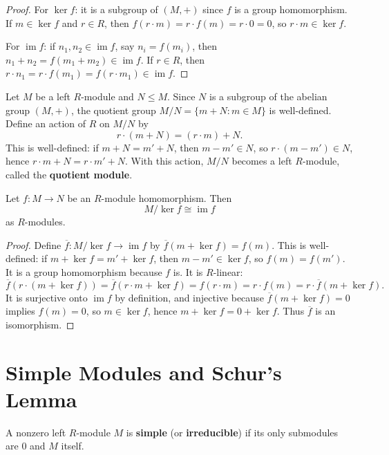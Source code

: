 \begin{proof}
For $\ker f$: it is a subgroup of $(M, +)$ since $f$ is a group homomorphism. If $m \in \ker f$ and $r \in R$, then $f(r \cdot m) = r \cdot f(m) = r \cdot 0 = 0$, so $r \cdot m \in \ker f$.

For $\operatorname{im} f$: if $n_1, n_2 \in \operatorname{im} f$, say $n_i = f(m_i)$, then $n_1 + n_2 = f(m_1 + m_2) \in \operatorname{im} f$. If $r \in R$, then $r \cdot n_1 = r \cdot f(m_1) = f(r \cdot m_1) \in \operatorname{im} f$.
\end{proof}

\begin{defn}
Let $M$ be a left $R$-module and $N \le M$. Since $N$ is a subgroup of the abelian group $(M, +)$, the quotient group $M/N = \{ m + N : m \in M \}$ is well-defined. Define an action of $R$ on $M/N$ by
\[
r \cdot (m + N) = (r \cdot m) + N.
\]
This is well-defined: if $m + N = m' + N$, then $m - m' \in N$, so $r \cdot (m - m') \in N$, hence $r \cdot m + N = r \cdot m' + N$. With this action, $M/N$ becomes a left $R$-module, called the \textbf{quotient module}.
\end{defn}

\begin{thm}
Let $f: M \to N$ be an $R$-module homomorphism. Then
\[
M / \ker f \cong \operatorname{im} f
\]
as $R$-modules.
\end{thm}

\begin{proof}
Define $\overline{f}: M/\ker f \to \operatorname{im} f$ by $\overline{f}(m + \ker f) = f(m)$. This is well-defined: if $m + \ker f = m' + \ker f$, then $m - m' \in \ker f$, so $f(m) = f(m')$. It is a group homomorphism because $f$ is. It is $R$-linear:
\[
\overline{f}(r \cdot (m + \ker f)) = \overline{f}(r \cdot m + \ker f) = f(r \cdot m) = r \cdot f(m) = r \cdot \overline{f}(m + \ker f).
\]
It is surjective onto $\operatorname{im} f$ by definition, and injective because $\overline{f}(m + \ker f) = 0$ implies $f(m) = 0$, so $m \in \ker f$, hence $m + \ker f = 0 + \ker f$. Thus $\overline{f}$ is an isomorphism.
\end{proof}

\section{Simple Modules and Schur's Lemma}

\begin{defn}
A nonzero left $R$-module $M$ is \textbf{simple} (or \textbf{irreducible}) if its only submodules are $0$ and $M$ itself.
\end{defn}

